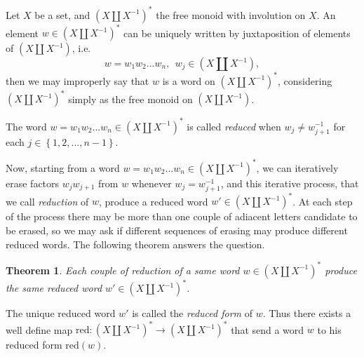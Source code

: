 \documentclass[12pt]{article}
\newtheorem{thm}{Theorem}
\begin{document}


\newcommand{\cbra}[1]{\left( #1 \right)}
\newcommand{\qbra}[1]{\left[ #1 \right]}
\newcommand{\gbra}[1]{\left\{ #1 \right\}}
\newcommand{\abra}[1]{\left\langle #1 \right\rangle}

\newcommand{\mipres}[2]{\mathrm{Inv}^1\abra{#1 | #2}}
\newcommand{\sipres}[2]{\mathrm{Inv}\abra{#1 | #2}}
\newcommand{\redu}{\mathrm{red}}

\newcommand{\double}[1]{\cbra{#1\amalg #1^{-1}}}
\newcommand{\doubles}[1]{\cbra{#1\amalg #1^{-1}}^\ast}
\newcommand{\doublep}[1]{\cbra{#1\amalg #1^{-1}}^+}
\newcommand{\fg}{\mathrm{FG}}

Let $X$ be a set, and $\doubles{X}$ the free monoid with involution on $X$. An element $w\in\doubles{X}$ can be uniquely written by juxtaposition of elements of $\double X$, i.e. $$w=w_1w_2...w_n,\ \ w_j\in\double X,$$
then we may improperly say that  $w$ is a word on $\doubles X$, considering $\doubles X$ simply as the free monoid on $\double X$.

The word $w=w_1w_2...w_n\in\doubles X$ is called \emph{reduced} when $w_j\neq w_{j+1}^{-1}$ for each $j\in\gbra{1,2,...,n-1}$.

Now, starting from a word $w=w_1w_2...w_n\in\doubles X$, we can iteratively erase factors $w_j w_{j+1}$ from $w$  whenever $w_j= w_{j+1}^{-1}$, and this iterative process, that we call \emph{reduction} of $w$, produce a reduced word $w'\in\doubles X$. At each step of the process there may be more than one couple of adiacent letters candidate to be erased, so we may ask if different sequences of erasing may produce different reduced words. The following theorem answers the question.
\begin{thm}
Each couple of reduction of a same word $w\in\doubles X$ produce the same reduced word $w'\in\doubles X$.
\end{thm}

The unique reduced word $w'$ is called the \emph{reduced form} of $w$. Thus there exists a well define map $\redu:\doubles X\rightarrow \doubles{X}$ that send a word $w$ to his reduced form $\redu(w)$.
\end{document}
